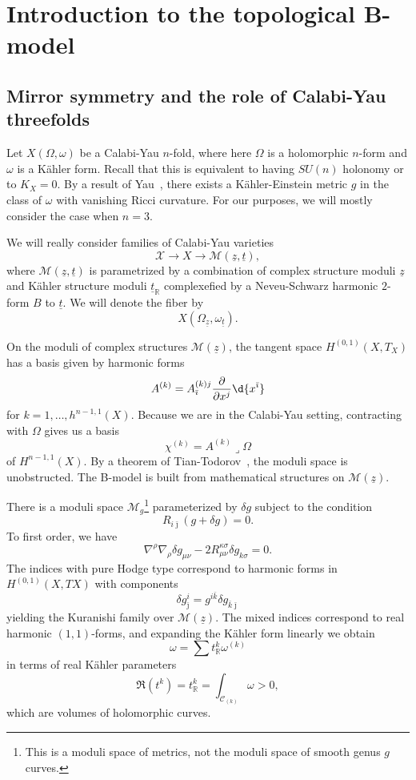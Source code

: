 \documentclass[10pt,oldfontcommands,oneside]{memoir}
\theoremstyle{definition}
\theoremstyle{remark}
\theoremstyle{plain}
\theoremstyle{definition}
\theoremstyle{remark}
\newcommand{\R}{\mathbb{R}}
\newcommand{\mc}[1]{\mathcal{#1}}
\newcommand{\ut}{\ul{t}}
\newcommand{\uz}{\ul{z}}
\newcommand{\ul}[1]{\underline{#1}}
\newcommand{\1}{\mathbf{1}}
\newcommand{\2}{\mathbf{2}}
\newcommand{\3}{\mathbf{3}}
\begin{document}
\section{Introduction to the topological B-model}%
\label{sec:Introduction to the topological B-model (Albrecht Klemm)}

\subsection{Mirror symmetry and the role of Calabi-Yau threefolds}%
\label{sub:Mirror symmetry and the role of Calabi-Yau threefolds}


Let $X(\Omega, \omega)$ be a Calabi-Yau $n$-fold, where here $\Omega$ is a holomorphic $n$-form and $\omega$ is a K\"ahler form. Recall that this is equivalent to having $SU(n)$ holonomy or to $K_X = 0$. By a result of Yau~\cite{calabiconj}, there exists a K\"ahler-Einstein metric $g$ in the class of $\omega$ with vanishing Ricci curvature. For our purposes, we will mostly consider the case when $n=3$.

We will really consider families of Calabi-Yau varieties
\[ \mc{X} \to X \to \mc{M}(\uz, \ut), \]
where $\mc{M}(\uz, \ut)$ is parametrized by a combination of complex structure moduli $\uz$ and K\"ahler structure moduli $\ut_{\R}$ complexefied by a Neveu-Schwarz harmonic $2$-form $B$ to $\ut$. We will denote the fiber by
\[ X(\Omega_{\uz}, \omega_{\ut}). \]

On the moduli of complex structures $\mc{M}(\uz)$, the tangent space $H^{(0,1)}(X,T_X)$ has a basis given by harmonic forms
\[ A^{(k)} = A_{\bar{\imath}}^{(k) j} \pdv{}{x^j} \d{x^{\bar{\imath}}} \]
for $k = 1, \ldots, h^{n-1,1}(X)$. Because we are in the Calabi-Yau setting, contracting with $\Omega$ gives us a basis
\[ \chi^{(k)} = A^{(k)} \lrcorner \Omega \]
of $H^{n-1,1}(X)$. By a theorem of Tian-Todorov~\cite{tiandef,todorovdef}, the moduli space is unobstructed. The B-model is built from mathematical structures on $\mc{M}(\uz)$.

There is a moduli space $\mc{M}_g$\footnote{This is a moduli space of metrics, not the moduli space of smooth genus $g$ curves.} parameterized by $\delta g$ subject to the condition
\[ R_{i\bar{\jmath}} (g+\delta g) = 0. \]
To first order, we have
\[ \nabla^{\rho} \nabla_{\rho} \delta g_{\mu\nu} - 2 R_{\mu\nu}^{\kappa\sigma} \delta g_{k\sigma} = 0. \]
The indices with pure Hodge type correspond to harmonic forms in $H^{(0,1)}(X, TX)$ with components
\[ \delta g_{\bar{\jmath}}^{i} = g^{i\bar{k}} \delta g_{\bar{k}\bar{\jmath}}  \]
yielding the Kuranishi family over $\mc{M}(\uz)$.
The mixed indices correspond to real harmonic $(1,1)$-forms, and expanding the K\"ahler form linearly we obtain
\[ \omega = \sum t_{\R}^k \omega^{(k)} \]
in terms of real K\"ahler parameters
\[  \Re(t^k) = t_{\R}^k = \int_{\mc{C}_{(k)}} \omega > 0, \] which are volumes of holomorphic curves.
\end{document}
